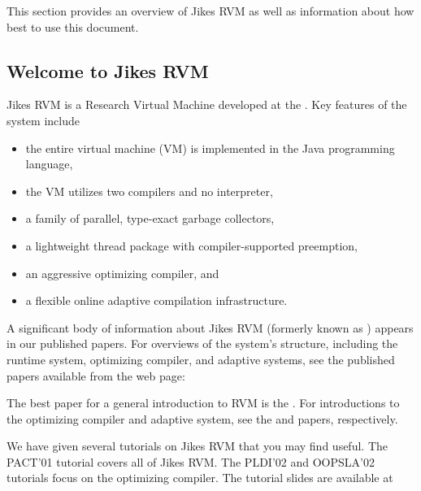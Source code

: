 This section provides an overview of Jikes\TMweb{} RVM as well as
information about how best to use this document.

\subsection{Welcome to Jikes RVM}

Jikes\TMboth{} RVM is a Research Virtual Machine 
 developed at the 
.  Key
features of the system include
\begin{itemize}
\item the entire virtual machine (VM) is implemented in the
  Java\TMboth{} programming language,
\item the VM utilizes two compilers and no interpreter,
\item a family of parallel, type-exact garbage collectors,
\item a lightweight thread package with compiler-supported preemption,
\item an aggressive optimizing compiler, and 
\item a flexible online adaptive compilation infrastructure.
\end{itemize}

A significant body of information about Jikes RVM 
(formerly known as 
\xlink{\jp}{\JalapenoHomeURL}) appears 
in our published
papers.  For overviews of the system's structure, including the runtime system,
optimizing compiler, and adaptive systems, see the published papers
available from the \jrvm{} web page:
\begin{quote}
\xlink{{\tt \RVMPubsURL}}{\RVMPubsURL}
\end{quote}

The best paper for a general introduction to RVM is 
the 
.  
For introductions to the
optimizing compiler and adaptive system, see the 
{\JavaGrandePaperURL}
 and 
{\tt \OOPSLAPaperURL}  
papers, respectively.

We have given several tutorials on Jikes RVM that you may find
useful. The PACT'01 tutorial covers all of Jikes RVM.  The PLDI'02 and
OOPSLA'02 tutorials focus on the optimizing compiler.  The tutorial
slides are available at
\begin{quote}
\xlink{{\tt \RVMSlidesURL}}{\RVMSlidesURL}
\end{quote}

